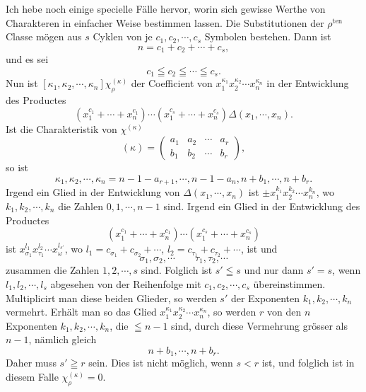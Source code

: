 \documentclass[11pt]{article}
\newcommand{\ten}{\mathrm{ten}}
\begin{document}
Ich hebe noch einige specielle Fälle hervor, worin sich gewisse Werthe von Charakteren in einfacher Weise bestimmen lassen. Die Substitutionen der $\rho^{\ten}$ Classe mögen aus $s$ Cyklen von je $c_1,c_2,
\cdots,c_s$ Symbolen bestehen. Dann ist
\begin{equation}\tag{1.}
 n=c_1+c_2+
\cdots+c_s,
\end{equation}
und es sei
\begin{equation}\tag{2.}
 c_1\leqq c_2\leqq\cdots\leqq c_s.
\end{equation}
Nun ist $[\kappa_1,
\kappa_2,
\cdots,
\kappa_n]\chi_\rho^{(\kappa)}$ der Coefficient von $x_1^{\kappa_1}x_2^{\kappa_2}\cdots x_n^{\kappa_n}$ in der Entwicklung des Productes
\begin{equation}\tag{3.}
 (x_1^{c_1}+
\cdots+x_n^{c_1})\cdots(x_1^{c_s}+
\cdots+x_n^{c_s})\Delta(x_1,
\cdots,x_n).
\end{equation}
Ist die Charakteristik von $\chi^{(\kappa)}$
\begin{equation}\tag{4.}
 (\kappa)=\left(\begin{matrix}a_1&a_2&\cdots&a_r\\ b_1&b_2&\cdots&b_r\end{matrix}\right),
\end{equation}
so ist
\[
 \kappa_1,
\kappa_2,
\cdots,
\kappa_n=n-1-a_{r+1},
\cdots,n-1-a_n,n+b_1,
\cdots,n+b_r.
\]
Irgend ein Glied in der Entwicklung von $\Delta(x_1,
\cdots,x_n)$ ist $\pm x_1^{k_1}x_2^{k_2}\cdots x_n^{k_n}$, wo $k_1,k_2,
\cdots,k_n$ die Zahlen $0,1,
\cdots,n-1$ sind. Irgend ein Glied in der Entwicklung des Productes
\begin{equation}\tag{5.}
 (x_1^{c_1}+
\cdots+x_n^{c_1})\cdots(x_1^{c_s}+
\cdots+x_n^{c_s})
\end{equation}
ist $x_{\sigma_1}^{l_1}x_{\tau_1}^{l_2}\cdots x_{\omega}^{l_{s'}}$, wo $l_1=c_{\sigma_1}+c_{\sigma_2}+\cdots$, $l_2=c_{\tau_1}+c_{\tau_2}+
\cdots$, ist und
\[
 \sigma_1,
\sigma_2,
\cdots\qquad \tau_1,
\tau_2,
\cdots
\]
zusammen die Zahlen $1,2,
\cdots,s$ sind. Folglich ist $s'\leqq s$ und nur dann $s'=s$, wenn $l_1,l_2,
\cdots,l_s$ abgesehen von der Reihenfolge mit $c_1,c_2,
\cdots,c_s$ übereinstimmen. Multiplicirt man diese beiden Glieder, so werden $s'$ der Exponenten $k_1,k_2,
\cdots,k_n$ vermehrt. Erhält man so das Glied $x_1^{\kappa_1}x_2^{\kappa_2}\cdots x_n^{\kappa_n}$, so werden $r$ von den $n$ Exponenten $k_1,k_2,
\cdots,k_n$, die $\leqq n-1$ sind, durch diese Vermehrung grösser als $n-1$, nämlich gleich
\[
 n+b_1,
\cdots,n+b_r.
\]
Daher muss $s'\geqq r$ sein. Dies ist nicht möglich, wenn $s<r$ ist, und folglich ist in diesem Falle $\chi_\rho^{(\kappa)}=0$.
\end{document}
